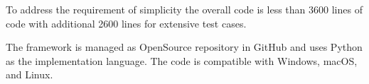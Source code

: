 To address the requirement of simplicity the overall code is less than
3600 lines of code with additional 2600 lines for extensive test
cases.

The framework is managed as OpenSource repository in GitHub and uses
Python as the implementation language. The code is compatible with
Windows, macOS, and Linux.
